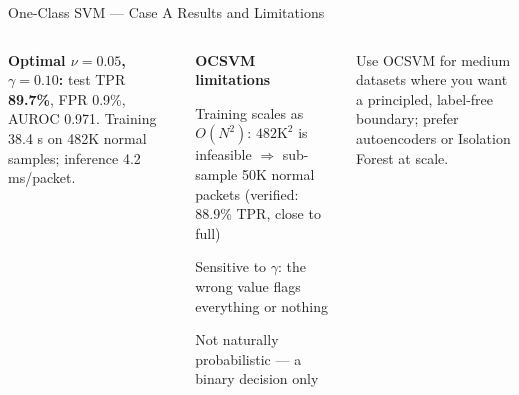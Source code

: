 \documentclass[aspectratio=169,10pt,t]{beamer}
\begin{document}
\begin{frame}{One-Class SVM --- Case A Results and Limitations}
\begin{columns}[T]
\begin{rbox}\scriptsize\textbf{Optimal $\nu=0.05$, $\gamma=0.10$:} test TPR \textbf{89.7\%}, FPR 0.9\%, AUROC 0.971. Training 38.4 s on 482K normal samples; inference 4.2 ms/packet.\end{rbox}
\begin{wbox}\scriptsize\textbf{OCSVM limitations}\begin{tl}\item Training scales as $O(N^2)$: $482\text{K}^2$ is infeasible $\Rightarrow$ sub-sample 50K normal packets (verified: 88.9\% TPR, close to full)\item Sensitive to $\gamma$: the wrong value flags everything or nothing\item Not naturally probabilistic --- a binary decision only\end{tl}\end{wbox}
\begin{ibox}\scriptsize Use OCSVM for medium datasets where you want a principled, label-free boundary; prefer autoencoders or Isolation Forest at scale.\end{ibox}
\end{columns}
\end{frame}
\end{document}
